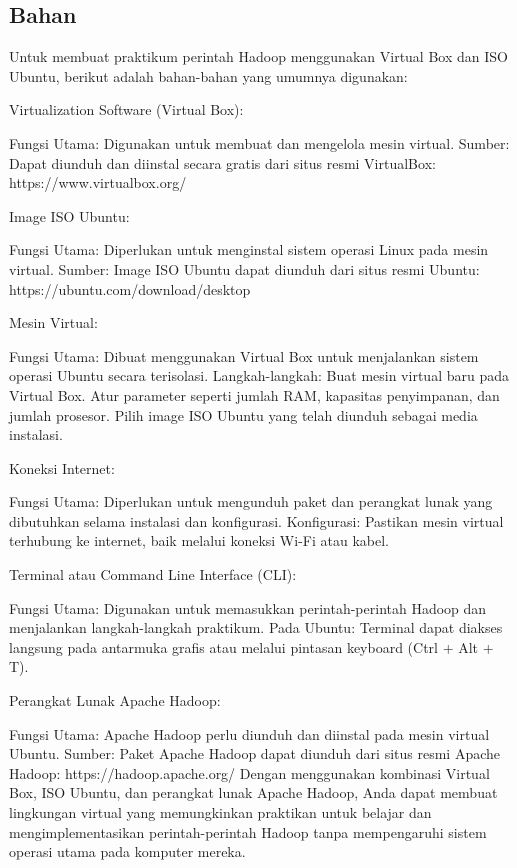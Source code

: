 \begin{multicols}{2}
\subsection{Bahan}
Untuk membuat praktikum perintah Hadoop menggunakan Virtual Box dan ISO Ubuntu, berikut adalah bahan-bahan yang umumnya digunakan:

Virtualization Software (Virtual Box):

Fungsi Utama: Digunakan untuk membuat dan mengelola mesin virtual.
Sumber: Dapat diunduh dan diinstal secara gratis dari situs resmi VirtualBox: https://www.virtualbox.org/

Image ISO Ubuntu:

Fungsi Utama: Diperlukan untuk menginstal sistem operasi Linux pada mesin virtual.
Sumber: Image ISO Ubuntu dapat diunduh dari situs resmi Ubuntu: https://ubuntu.com/download/desktop

Mesin Virtual:

Fungsi Utama: Dibuat menggunakan Virtual Box untuk menjalankan sistem operasi Ubuntu secara terisolasi.
Langkah-langkah:
Buat mesin virtual baru pada Virtual Box.
Atur parameter seperti jumlah RAM, kapasitas penyimpanan, dan jumlah prosesor.
Pilih image ISO Ubuntu yang telah diunduh sebagai media instalasi.

Koneksi Internet:

Fungsi Utama: Diperlukan untuk mengunduh paket dan perangkat lunak yang dibutuhkan selama instalasi dan konfigurasi.
Konfigurasi: Pastikan mesin virtual terhubung ke internet, baik melalui koneksi Wi-Fi atau kabel.

Terminal atau Command Line Interface (CLI):

Fungsi Utama: Digunakan untuk memasukkan perintah-perintah Hadoop dan menjalankan langkah-langkah praktikum.
Pada Ubuntu: Terminal dapat diakses langsung pada antarmuka grafis atau melalui pintasan keyboard (Ctrl + Alt + T).

Perangkat Lunak Apache Hadoop:

Fungsi Utama: Apache Hadoop perlu diunduh dan diinstal pada mesin virtual Ubuntu.
Sumber: Paket Apache Hadoop dapat diunduh dari situs resmi Apache Hadoop: https://hadoop.apache.org/
Dengan menggunakan kombinasi Virtual Box, ISO Ubuntu, dan perangkat lunak Apache Hadoop, Anda dapat membuat lingkungan virtual yang memungkinkan praktikan untuk belajar dan mengimplementasikan perintah-perintah Hadoop tanpa mempengaruhi sistem operasi utama pada komputer mereka.
\end{multicols}